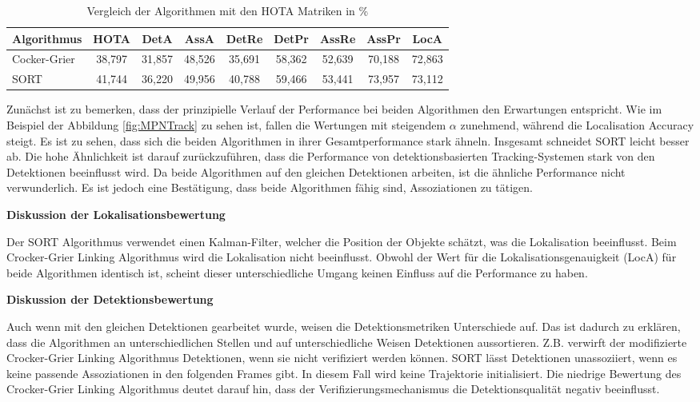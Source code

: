 \begin{table}[htbp]
\centering
\caption{Vergleich der Algorithmen mit den HOTA Matriken in \%}
\label{tab:verglHOTA}
\begin{tabular}{
  l
  S[table-format=2.3]
  S[table-format=2.3]
  S[table-format=2.3]
  S[table-format=2.3]
  S[table-format=2.3]
  S[table-format=2.3]
  S[table-format=2.3]
  S[table-format=2.3]
}
\toprule
{Algorithmus} & {HOTA} & {DetA} & {AssA} & {DetRe} & {DetPr} & {AssRe} & {AssPr} & {LocA} \\
\midrule
Cocker-Grier  & 38,797 & 31,857 & 48,526 & 35,691  & 58,362  & 52,639  & 70,188  & 72,863 \\
SORT          & 41,744 & 36,220 & 49,956 & 40,788  & 59,466  & 53,441  & 73,957  & 73,112 \\
\bottomrule
\end{tabular}
\end{table}

Zunächst ist zu bemerken, dass der prinzipielle Verlauf der Performance bei beiden Algorithmen den Erwartungen entspricht. Wie im Beispiel der Abbildung \ref{fig:MPNTrack} zu sehen ist, fallen die Wertungen mit steigendem \(\alpha\) zunehmend, während die Localisation Accuracy steigt. Es ist zu sehen, dass sich die beiden Algorithmen in ihrer Gesamtperformance stark ähneln. Insgesamt schneidet SORT leicht besser ab. Die hohe Ähnlichkeit ist darauf zurückzuführen, dass die Performance von detektionsbasierten Tracking-Systemen stark von den Detektionen beeinflusst wird. Da beide Algorithmen auf den gleichen Detektionen arbeiten, ist die ähnliche Performance nicht verwunderlich. Es ist jedoch eine Bestätigung, dass beide Algorithmen fähig sind, Assoziationen zu tätigen.\dubpar

\textbf{Diskussion der Lokalisationsbewertung}\par
Der SORT Algorithmus verwendet einen Kalman-Filter, welcher die Position der Objekte schätzt, was die Lokalisation beeinflusst. Beim Crocker-Grier Linking Algorithmus wird die Lokalisation nicht beeinflusst. Obwohl der Wert für die Lokalisationsgenauigkeit (LocA) für beide Algorithmen identisch ist, scheint dieser unterschiedliche Umgang keinen Einfluss auf die Performance zu haben.\dubpar

\textbf{Diskussion der Detektionsbewertung}\par
Auch wenn mit den gleichen Detektionen gearbeitet wurde, weisen die Detektionsmetriken Unterschiede auf. Das ist dadurch zu erklären, dass die Algorithmen an unterschiedlichen Stellen und auf unterschiedliche Weisen Detektionen aussortieren. Z.B. verwirft der modifizierte Crocker-Grier Linking Algorithmus Detektionen, wenn sie nicht verifiziert werden können. SORT lässt Detektionen unassoziiert, wenn es keine passende Assoziationen in den folgenden Frames gibt. In diesem Fall wird keine Trajektorie initialisiert. Die niedrige Bewertung des Crocker-Grier Linking Algorithmus deutet darauf hin, dass der Verifizierungsmechanismus die Detektionsqualität negativ beeinflusst. \par


